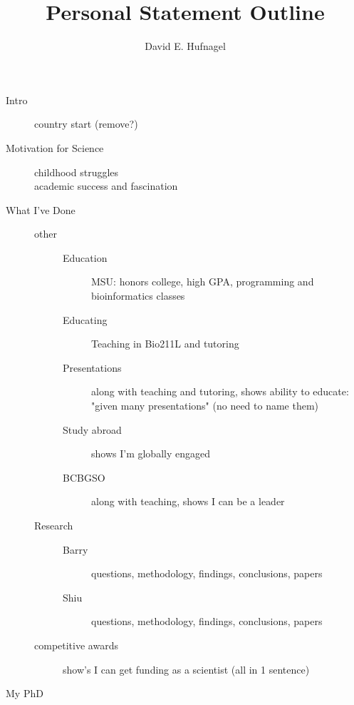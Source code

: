 \documentclass[11pt]{amsart}
\title{Personal Statement Outline}
\author{David E. Hufnagel}
\begin{document}
\maketitle

\begin{description}
	\item[Intro] country start (remove?)
	\item[Motivation for Science] \hfill 
		\begin{description}
			\item[childhood struggles]
			\item[academic success and fascination]
		\end{description}
	\item[What I've Done] \hfill 
		\begin{description}
			\item[other] \hfill 
				\begin{description}
					\item[Education] MSU: honors college, high GPA, programming 					and bioinformatics classes
					\item[Educating] Teaching in Bio211L and tutoring
					\item[Presentations] along with teaching and tutoring, shows 						ability to educate: "given many presentations" (no need to name 					them)
					\item[Study abroad] shows I'm globally engaged
					\item[BCBGSO] along with teaching, shows I can be a leader
				\end{description}
			\item[Research] \hfill 
				\begin{description}
					\item[Barry] questions, methodology, findings, conclusions, papers
					\item[Shiu] questions, methodology, findings, conclusions, papers
				\end{description}
			\item[competitive awards] show's I can get funding as a scientist (all in 1 				sentence)
		\end{description}
	\item[My PhD] \hfill 

\end{description}
\end{document}
